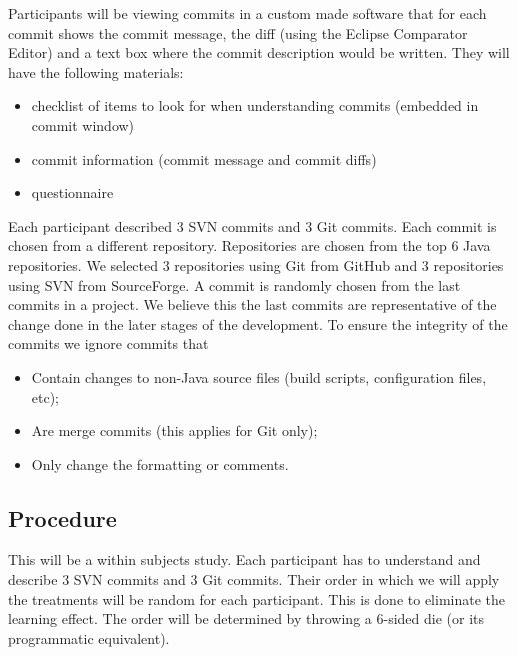 \documentclass[letterpaper]{article}
\begin{document}
Participants will be viewing commits in a custom made software that for each commit shows the commit message, the diff (using the Eclipse Comparator Editor) and a text box where the commit description would be written.
They will have the following materials:
\begin{itemize}
	\item checklist of items to look for when understanding commits (embedded in commit window)
	\item commit information (commit message and commit diffs)
	\item questionnaire
\end {itemize}

Each participant described 3 SVN commits and 3 Git commits.
Each commit is chosen from a different repository.
Repositories are chosen from the top 6 Java repositories.
We selected 3 repositories using Git from GitHub and 3 repositories using SVN from SourceForge.
A commit is randomly chosen from the last commits in a project.
We believe this the last commits are representative of the change done in the later stages of the development.
To ensure the integrity of the commits we ignore commits that 
\begin{itemize}
	\item Contain changes to non-Java source files (build scripts, configuration files, etc);
	\item Are merge commits (this applies for Git only);
	\item Only change the formatting or comments.
\end{itemize}

\subsection{Procedure}

This will be a within subjects study. 
Each participant has to understand and describe 3 SVN commits and 3 Git commits. 
Their order in which we will apply the treatments will be random for each participant. 
This is done to eliminate the learning effect. 
The order will be determined by throwing a 6-sided die (or its programmatic equivalent).
\end{document}
